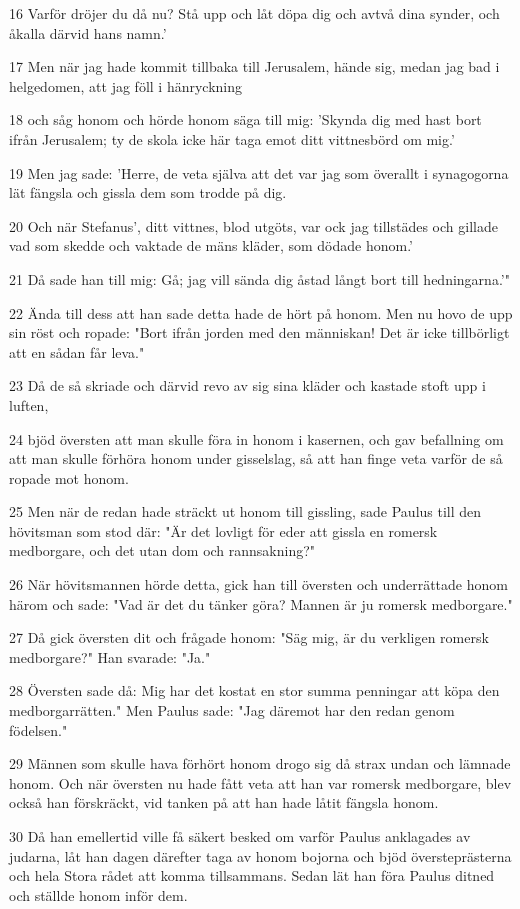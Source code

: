 \par 16 Varför dröjer du då nu? Stå upp och låt döpa dig och avtvå dina synder, och åkalla därvid hans namn.'
\par 17 Men när jag hade kommit tillbaka till Jerusalem, hände sig, medan jag bad i helgedomen, att jag föll i hänryckning
\par 18 och såg honom och hörde honom säga till mig: 'Skynda dig med hast bort ifrån Jerusalem; ty de skola icke här taga emot ditt vittnesbörd om mig.'
\par 19 Men jag sade: 'Herre, de veta själva att det var jag som överallt i synagogorna lät fängsla och gissla dem som trodde på dig.
\par 20 Och när Stefanus', ditt vittnes, blod utgöts, var ock jag tillstädes och gillade vad som skedde och vaktade de mäns kläder, som dödade honom.'
\par 21 Då sade han till mig: Gå; jag vill sända dig åstad långt bort till hedningarna.'"
\par 22 Ända till dess att han sade detta hade de hört på honom. Men nu hovo de upp sin röst och ropade: "Bort ifrån jorden med den människan! Det är icke tillbörligt att en sådan får leva."
\par 23 Då de så skriade och därvid revo av sig sina kläder och kastade stoft upp i luften,
\par 24 bjöd översten att man skulle föra in honom i kasernen, och gav befallning om att man skulle förhöra honom under gisselslag, så att han finge veta varför de så ropade mot honom.
\par 25 Men när de redan hade sträckt ut honom till gissling, sade Paulus till den hövitsman som stod där: "Är det lovligt för eder att gissla en romersk medborgare, och det utan dom och rannsakning?"
\par 26 När hövitsmannen hörde detta, gick han till översten och underrättade honom härom och sade: "Vad är det du tänker göra? Mannen är ju romersk medborgare."
\par 27 Då gick översten dit och frågade honom: "Säg mig, är du verkligen romersk medborgare?" Han svarade: "Ja."
\par 28 Översten sade då: Mig har det kostat en stor summa penningar att köpa den medborgarrätten." Men Paulus sade: "Jag däremot har den redan genom födelsen."
\par 29 Männen som skulle hava förhört honom drogo sig då strax undan och lämnade honom. Och när översten nu hade fått veta att han var romersk medborgare, blev också han förskräckt, vid tanken på att han hade låtit fängsla honom.
\par 30 Då han emellertid ville få säkert besked om varför Paulus anklagades av judarna, låt han dagen därefter taga av honom bojorna och bjöd översteprästerna och hela Stora rådet att komma tillsammans. Sedan lät han föra Paulus ditned och ställde honom inför dem.

